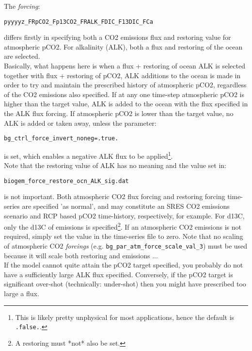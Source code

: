 \documentclass[10pt,twoside]{article}
\begin{document}
\begin{compactenum}
\item The \textit{forcing}:
\vspace{-5pt}\begin{verbatim}
pyyyyz_FRpCO2_Fp13CO2_FRALK_FDIC_F13DIC_FCa
\end{verbatim}\vspace{-5pt}
differs firstly in specifying both a CO2 emissions flux and restoring value for atmospheric pCO2. For alkalinity (ALK), both a flux and restoring of the ocean are selected.
\\ Basically, what happens here is when a flux + restoring of ocean ALK is selected together with flux + restoring of pCO2, ALK additions to the ocean is made in order to try and maintain the prescribed history of atmospheric pCO2, regardless of the CO2 emissions also specified. If at any one time-step atmospheric pCO2 is higher than the target value, ALK is added to the ocean with the flux specified in the ALK flux forcing. If atmospheric pCO2 is lower than the target value, no ALK is added or taken away, unless the parameter:
\vspace{-5pt}\begin{verbatim}
bg_ctrl_force_invert_noneg=.true.
\end{verbatim}\vspace{-5pt}
is set, which enables a negative ALK flux to be applied\footnote{This is likely pretty unphysical for most applications, hence the default is \texttt{.false.}.}.
\\ Note that the restoring value of ALK has no meaning and the value set in:
\vspace{-5pt}\begin{verbatim}
biogem_force_restore_ocn_ALK_sig.dat
\end{verbatim}\vspace{-5pt}
is not important.
Both atmospheric CO2 flux forcing and restoring forcing time-series are specified 'as normal', and may constitute an SRES CO2 emissions scenario and RCP based pCO2 time-history, respectively, for example. For d13C, only the d13C of emissions is specified\footnote{A restoring must *not* also be set.}.
If an atmospheric CO2 emissions is not required, simply set the value in the time-series file to zero.
Note that no scaling of atmospheric CO2 \textit{forcings} (e.g. \texttt{bg\_par\_atm\_force\_scale\_val\_3}) must be used because it will scale both restoring and emissions ...
\\ If the model cannot quite attain the pCO2 target specified, you probably do not have a sufficiently large ALK flux specified. Conversely, if the pCO2 target is significant over-shot (technically: under-shot) then you might have prescribed too large a flux.

\end{compactenum}
\end{document}
